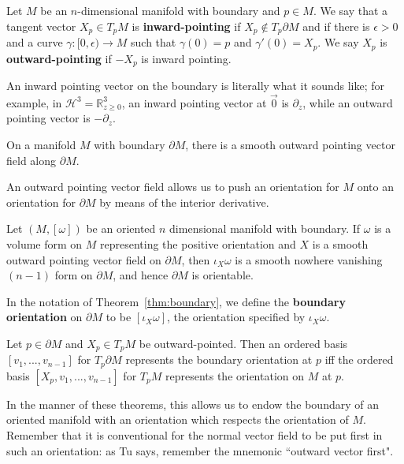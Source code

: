 \begin{definition}
	Let $M$ be an $n$-dimensional manifold with boundary and $p\in M$. We say that a tangent vector $X_p\in T_p M$ is 
	\textbf{inward-pointing} if $X_p\not\in T_p\partial M$ and if there is $\epsilon > 0$ and a curve $\gamma : [0, \epsilon)
	\rightarrow M$ such that $\gamma(0) = p$ and $\gamma'(0) = X_p$. We say $X_p$ is \textbf{outward-pointing} if 
	$-X_p$ is inward pointing. 
\end{definition}
An inward pointing vector on the boundary is literally what it sounds like; for example, in $\mathcal H^3 = \mathbb R^3_{z\geq 
0}$, an inward pointing vector at $\vec 0$ is $\partial_z$, while an outward pointing vector is $-\partial_z$. 
\begin{theorem}
	On a manifold $M$ with boundary $\partial M$, there is a smooth outward pointing vector field along $\partial M$. 
\end{theorem}
An outward pointing vector field allows us to push an orientation for $M$ onto an orientation for $\partial M$ by means 
of the interior derivative. 
\begin{theorem}
	Let $(M, [\omega])$ be an oriented $n$ dimensional manifold with boundary. If $\omega$ is a volume form on $M$ 
	representing the positive orientation and $X$ is a 
	smooth outward pointing vector field on $\partial M$, then $\iota_X\omega$ is a smooth nowhere vanishing $(n - 1)$ 
	form on $\partial M$, and hence $\partial M$ is orientable. ~
	\label{thm:boundary}
\end{theorem}
\begin{definition}
	In the notation of Theorem~\ref{thm:boundary}, we define the \textbf{boundary orientation} on $\partial M$ to 
	be $[\iota_X\omega]$, the orientation specified by $\iota_X\omega$. 
\end{definition}
\begin{corollary}
	Let $p\in\partial M$ and $X_p\in T_p M$ be outward-pointed. Then an ordered basis $[v_1, ..., v_{n - 1}]$ for $T_p
	\partial M$ represents the boundary orientation at $p$ iff the ordered basis $[X_p, v_1, ..., v_{n - 1}]$ for $T_p M$ 
	represents the orientation on $M$ at $p$. 
\end{corollary}
In the manner of these theorems, this allows us to endow the boundary of an oriented manifold with an orientation which 
respects the orientation of $M$. Remember that it is conventional for the normal vector field to be put first in such an 
orientation: as Tu says, remember the mnemonic ``outward vector first". 

